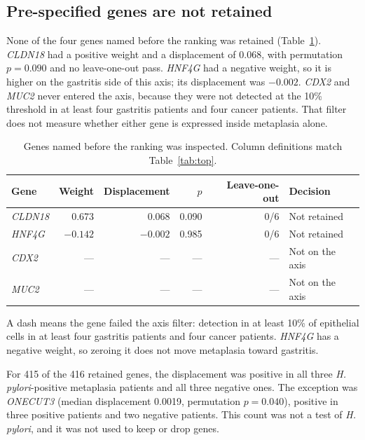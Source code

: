 \documentclass[11pt,a4paper]{article}
\begin{document}
\subsection{Pre-specified genes are not retained}

None of the four genes named before the ranking was retained (Table~\ref{tab:pre}). \textit{CLDN18} had a positive weight and a displacement of 0.068, with permutation \(p=0.090\) and no leave-one-out pass. \textit{HNF4G} had a negative weight, so it is higher on the gastritis side of this axis; its displacement was \(-0.002\). \textit{CDX2} and \textit{MUC2} never entered the axis, because they were not detected at the 10\% threshold in at least four gastritis patients and four cancer patients. That filter does not measure whether either gene is expressed inside metaplasia alone.

\begin{table}[htbp]
  \centering
  \caption{Genes named before the ranking was inspected. Column definitions match Table~\ref{tab:top}.}
  \label{tab:pre}
  \small
  \begin{tabular}{lrrrrl}
    \toprule
    Gene & Weight & Displacement & \(p\) & Leave-one-out & Decision \\
    \midrule
    \textit{CLDN18} & 0.673 & 0.068 & 0.090 & 0/6 & Not retained \\
    \textit{HNF4G} & $-0.142$ & $-0.002$ & 0.985 & 0/6 & Not retained \\
    \textit{CDX2} & --- & --- & --- & --- & Not on the axis \\
    \textit{MUC2} & --- & --- & --- & --- & Not on the axis \\
    \bottomrule
  \end{tabular}
  \par\vspace{0.35em}
  {\raggedright\footnotesize A dash means the gene failed the axis filter: detection in at least 10\% of epithelial cells in at least four gastritis patients and four cancer patients. \textit{HNF4G} has a negative weight, so zeroing it does not move metaplasia toward gastritis.\par}
\end{table}

For 415 of the 416 retained genes, the displacement was positive in all three \textit{H. pylori}-positive metaplasia patients and all three negative ones. The exception was \textit{ONECUT3} (median displacement 0.0019, permutation \(p=0.040\)), positive in three positive patients and two negative patients. This count was not a test of \textit{H. pylori}, and it was not used to keep or drop genes.
\end{document}
